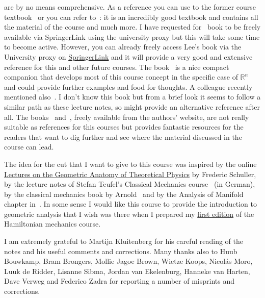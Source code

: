 \documentclass[nobib, a4paper]{tufte-book}
\theoremstyle{plain}
\theoremstyle{definition}
\theoremstyle{remark}
\newcommand{\R}{\mathbb{R}}
\begin{document}
 are by no means comprehensive.
As a reference you can use to the former course textbook~\cite{book:tu} or you can refer to~\cite{book:lee}: it is an incredibly good textbook and contains all the material of the course and much more.
I have requested for~\cite{book:tu} book to be freely available via SpringerLink using the university proxy but this will take some time to become active.
However, you can already freely access Lee's book via the University proxy on \href{https://link.springer.com/book/10.1007/978-1-4419-9982-5}{SpringerLink} and it will provide a very good and extensive reference for this and other future courses.
The book~\cite{book:McInerney} is a nice compact companion that develops most of this course concept in the specific case of $\R^n$ and could provide further examples and food for thoughts.
A colleague recently mentioned also~\cite{book:lang}. I don't know this book but from a brief look it seems to follow a similar path as these lecture notes, so might provide an alternative reference after all.
The books~\cite{book:nicolaescu} and~\cite{book:crane}, freely available from the authors' website, are not really suitable as references for this courses but provides fantastic resources for the readers that want to dig further and see where the material discussed in the course can lead.

The idea for the cut that I want to give to this course was inspired by the online \href{https://www.video.uni-erlangen.de/course/id/242}{Lectures on the Geometric Anatomy of Theoretical Physics} by Frederic Schuller, by the lecture notes of Stefan Teufel's Classical Mechanics course~\cite{lectures:teufel} (in German), by the classical mechanics book by Arnold~\cite{book:arnold} and by the Analysis of Manifold chapter in~\cite{book:thirring}.
In some sense I would like this course to provide the introduction to geometric analysis that I wish was there when I prepared my \href{https://www.mseri.me/lecture-notes-hamiltonian-mechanics/}{first edition} of the Hamiltonian mechanics course.

I am extremely grateful to Martijn Kluitenberg for his careful reading of the notes and his useful comments and corrections.
Many thanks also to Huub Bouwkamp, Bram Brongers, Mollie Jagoe Brown, Wietze Koops, Nicol\'as Moro, Luuk de Ridder, Lisanne Sibma, Jordan van Ekelenburg, Hanneke van Harten, Dave Verweg and Federico Zadra for reporting a number of misprints and corrections.
\end{document}
